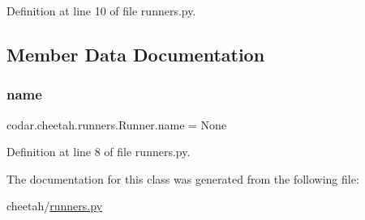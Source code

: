 Definition at line 10 of file runners.\+py.



\subsection{Member Data Documentation}
\mbox{\label{classcodar_1_1cheetah_1_1runners_1_1_runner_aa2c0d84fbe4396e2a42cb84923c3a264}} 
\subsubsection{\texorpdfstring{name}{name}}
{\footnotesize\ttfamily codar.\+cheetah.\+runners.\+Runner.\+name = None\hspace{0.3cm}{\ttfamily [static]}}



Definition at line 8 of file runners.\+py.



The documentation for this class was generated from the following file\+:\begin{DoxyCompactItemize}
\item 
cheetah/\hyperlink{cheetah_2runners_8py}{runners.\+py}\end{DoxyCompactItemize}
